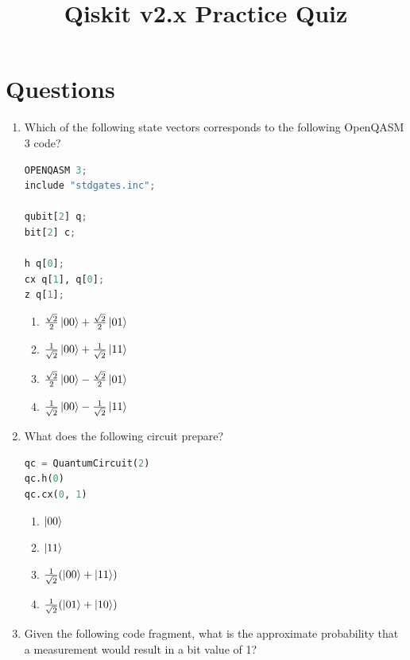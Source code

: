 \documentclass[11pt,a4paper]{article}
\title{Qiskit v2.x Practice Quiz}
\date{}
\begin{document}
\maketitle

\section*{Questions}

\begin{enumerate}
\item Which of the following state vectors corresponds to the following OpenQASM 3 code?

\begin{lstlisting}[language=Python]
OPENQASM 3;
include "stdgates.inc";

qubit[2] q;
bit[2] c;

h q[0];
cx q[1], q[0];
z q[1];

\end{lstlisting}

\begin{enumerate}[label=\Alph*.]
\item $\frac{\sqrt{2}}{2}\ket{00} + \frac{\sqrt{2}}{2}\ket{01}$
\item $\frac{1}{\sqrt{2}}\ket{00} + \frac{1}{\sqrt{2}}\ket{11}$
\item $\frac{\sqrt{2}}{2}\ket{00} - \frac{\sqrt{2}}{2}\ket{01}$
\item $\frac{1}{\sqrt{2}}\ket{00} - \frac{1}{\sqrt{2}}\ket{11}$
\end{enumerate}

\item What does the following circuit prepare?

\begin{lstlisting}[language=Python]
qc = QuantumCircuit(2)
qc.h(0)
qc.cx(0, 1)

\end{lstlisting}

\begin{enumerate}[label=\Alph*.]
\item $\ket{00}$
\item $\ket{11}$
\item $\frac{1}{\sqrt{2}}(\ket{00}+\ket{11})$
\item $\frac{1}{\sqrt{2}}(\ket{01}+\ket{10})$
\end{enumerate}

\item Given the following code fragment, what is the approximate probability that a measurement would result in a bit value of 1?


\end{enumerate}
\end{document}
